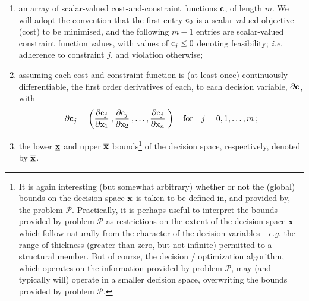 \documentclass[11pt]{article}
\begin{document}
\begin{enumerate}[label=(\roman*)]
  \item an array of scalar-valued cost-and-constraint functions $\mathbf{c}$, of length $m$. We will adopt the convention that the first entry $\textrm{c}_0$ is a scalar-valued objective (cost) to be minimised, and the following $m-1$ entries are scalar-valued constraint function values, with values of $\textrm{c}_j \leq 0$ denoting feasibility; \emph{i.e.} adherence to constraint $j$, and violation otherwise;
  \item assuming each cost and constraint function is (at least once) continuously differentiable, the first order derivatives of each, to each decision variable, $\mathbf{\partial c}$, with
\begin{equation}
\mathbf{\partial c }_j = \left( \frac{\partial \textrm{c}_j}{\partial \textrm{x}_1 } \:,  \frac{\partial \textrm{c}_j}{\partial \textrm{x}_2} \: , \ldots,  \frac{\partial \textrm{c}_j}{\partial \textrm{x}_n} \: \right) \quad \text{for} \quad j = 0,1, \ldots, m \:;
\end{equation}
  \item the  lower $\underline{\mathbf{x}}$ and upper $\overline{\mathbf{x}}$ bounds\footnote{It is again interesting (but somewhat arbitrary) whether or not the (global) bounds on the decision space $\mathbf{x}$ is taken to be defined in, and provided by, the problem $\mathcal{P}$. Practically, it is perhaps useful to interpret the bounds provided by problem $\mathcal{P}$ as restrictions on the extent of the decision space $\mathbf{x}$ which follow naturally from the character of the decision variables---\emph{e.g.} the range of thickness (greater than zero, but not infinite) permitted to a structural member. But of course, the decision / optimization algorithm, which operates on the information provided by problem $\mathcal{P}$, may (and typically will) operate in a smaller decision space, overwriting the bounds provided by problem $\mathcal{P}$.} of the decision space, respectively, denoted by $\underline{\overline{\mathbf{x}}}$.
\end{enumerate}
\end{document}
